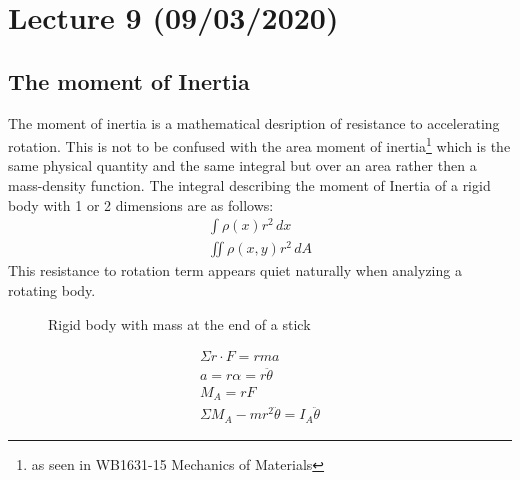 \documentclass[11pt, a4paper]{article}
\begin{document}
\setcounter{section}{8}
\section{Lecture 9 (09/03/2020)}
\subsection{The moment of Inertia}
The moment of inertia is a mathematical desription of resistance to accelerating rotation.
This is not to be confused with the area moment of inertia\footnote{ as seen in WB1631-15 Mechanics of Materials} which is the same physical quantity and the
same integral but over an area  rather then a mass-density function. The integral describing the moment of
Inertia of a rigid body with 1 or 2 dimensions are as follows: 
\begin{gather}
  \int \rho(x)r^2\,dx\\
  \iint \rho(x, y)r^2\,dA
\end{gather}
This resistance to rotation term appears quiet naturally when analyzing a rotating body.
\begin{figure}[h]
  \centering
  \qquad
  \caption{Rigid body with mass at the end of a stick}
\end{figure}
\begin{gather}
  \Sigma r\cdot F = rma\\
  a = r\alpha = r\ddot{\theta}\\
  M_A = rF\\
  \Sigma M_A - mr^2\ddot{\theta} = I_A \ddot{\theta}
\end{gather}
\end{document}
